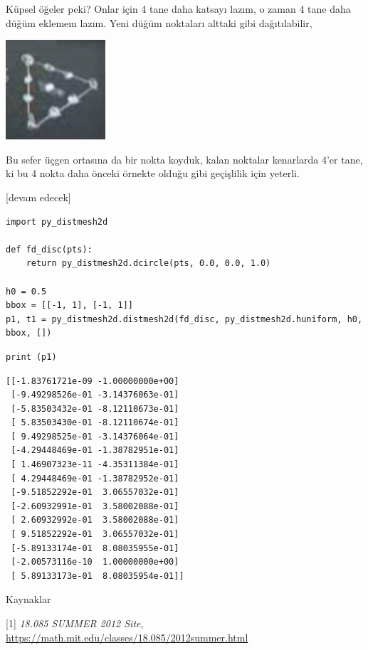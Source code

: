 \documentclass[12pt,fleqn]{article}\usepackage{../../common}
\begin{document}
Küpsel öğeler peki? Onlar için 4 tane daha katsayı lazım, o zaman 4 tane
daha düğüm eklemem lazım. Yeni düğüm noktaları alttaki gibi dağıtılabilir,

\includegraphics[width=10em]{compscieng_1_27_07.png}

Bu sefer üçgen ortasına da bir nokta koyduk, kalan noktalar kenarlarda 4'er
tane, ki bu 4 nokta daha önceki örnekte olduğu gibi geçişlilik için yeterli.

[devam edecek]






















\begin{verbatim}
import py_distmesh2d
  
def fd_disc(pts):
    return py_distmesh2d.dcircle(pts, 0.0, 0.0, 1.0)

h0 = 0.5
bbox = [[-1, 1], [-1, 1]]
p1, t1 = py_distmesh2d.distmesh2d(fd_disc, py_distmesh2d.huniform, h0, bbox, [])
\end{verbatim}


\begin{verbatim}
print (p1)
\end{verbatim}

\begin{verbatim}
[[-1.83761721e-09 -1.00000000e+00]
 [-9.49298526e-01 -3.14376063e-01]
 [-5.83503432e-01 -8.12110673e-01]
 [ 5.83503430e-01 -8.12110674e-01]
 [ 9.49298525e-01 -3.14376064e-01]
 [-4.29448469e-01 -1.38782951e-01]
 [ 1.46907323e-11 -4.35311384e-01]
 [ 4.29448469e-01 -1.38782952e-01]
 [-9.51852292e-01  3.06557032e-01]
 [-2.60932991e-01  3.58002088e-01]
 [ 2.60932992e-01  3.58002088e-01]
 [ 9.51852292e-01  3.06557032e-01]
 [-5.89133174e-01  8.08035955e-01]
 [-2.00573116e-10  1.00000000e+00]
 [ 5.89133173e-01  8.08035954e-01]]
\end{verbatim}




Kaynaklar

[1] {\em 18.085 SUMMER 2012 Site},
    \url{https://math.mit.edu/classes/18.085/2012summer.html}
\end{document}
